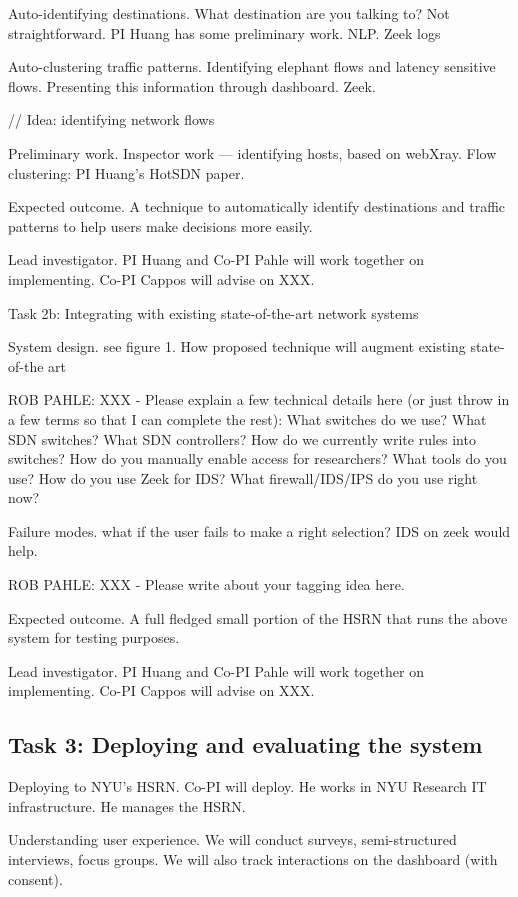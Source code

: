Auto-identifying destinations. What destination are you talking to? Not straightforward. PI Huang has some preliminary work. NLP. Zeek logs

Auto-clustering traffic patterns. Identifying elephant flows and latency sensitive flows. Presenting this information through dashboard.  Zeek.

// Idea: identifying network flows

Preliminary work. Inspector work — identifying hosts, based on webXray. Flow clustering: PI Huang’s HotSDN paper.

Expected outcome. A technique to automatically identify destinations and traffic patterns to help users make decisions more easily.

Lead investigator. PI Huang and Co-PI Pahle will work together on implementing. Co-PI Cappos will advise on XXX.


Task 2b: Integrating with existing state-of-the-art network systems

System design. see figure 1. How proposed technique will augment existing state-of-the art

ROB PAHLE: XXX - Please explain a few technical details here (or just throw in a few terms so that I can complete the rest):
What switches do we use?
What SDN switches? What SDN controllers?
How do we currently write rules into switches?
How do you manually enable access for researchers? What tools do you use?
How do you use Zeek for IDS?
What firewall/IDS/IPS do you use right now?

Failure modes. what if the user fails to make a right selection? IDS on zeek would help.

ROB PAHLE: XXX - Please write about your tagging idea here.

Expected outcome. A full fledged small portion of the HSRN that runs the above system for testing purposes.

Lead investigator. PI Huang and Co-PI Pahle will work together on implementing. Co-PI Cappos will advise on XXX.

\subsection{Task 3: Deploying and evaluating the system}

Deploying to NYU’s HSRN. Co-PI will deploy. He works in NYU Research IT infrastructure. He manages the HSRN.

Understanding user experience. We will conduct surveys, semi-structured interviews, focus groups. We will also track interactions on the dashboard (with consent).


